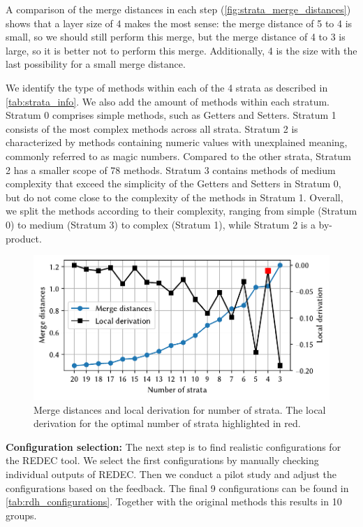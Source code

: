 \documentclass[%
class=scrreprt,
chapterprefix=false,%
open=right,%
twoside=false,%
paper=a4,%
logofile={Logo\_zentral\_farbig\_EN.png},%
thesistype=master,%
UKenglish,%
]{se2thesis}
\theoremstyle{definition}
\newcommand{\rdh}{REDEC\xspace}
\begin{document}
	A comparison of the merge distances in each step (\autoref{fig:strata_merge_distances}) shows that a layer size of 4 makes the most sense: the merge distance of 5 to 4 is small, so we should still perform this merge, but the merge distance of 4 to 3 is large, so it is better not to perform this merge. Additionally, 4 is the size with the last possibility for a small merge distance.
	
	We identify the type of methods within each of the 4 strata as described in \autoref{tab:strata_info}. We also add the amount of methods within each stratum. 
	Stratum 0 comprises simple methods, such as Getters and Setters. Stratum 1 consists of the most complex methods across all strata. 
	Stratum 2 is characterized by methods containing numeric values with unexplained meaning, commonly referred to as magic numbers. Compared to the other strata, Stratum 2 has a smaller scope of 78 methods. 
	Stratum 3 contains methods of medium complexity that exceed the simplicity of the Getters and Setters in Stratum 0, but do not come close to the complexity of the methods in Stratum 1. 
	Overall, we split the methods according to their complexity, ranging from simple (Stratum 0) to medium (Stratum 3) to complex (Stratum 1), while Stratum 2 is a by-product.
	
	\begin{figure}[tb]
		\centering
		\includegraphics[width=\textwidth]{img/strata_merge_distances.pdf}
		\caption{Merge distances and local derivation for number of strata. The local derivation for the optimal number of strata highlighted in red.} 
		\label{fig:strata_merge_distances}
	\end{figure}
	
	\textbf{Configuration selection:} The next step is to find realistic configurations for the \rdh tool. We select the first configurations by manually checking individual outputs of \rdh. Then we conduct a pilot study and adjust the configurations based on the feedback.
	The final 9 configurations can be found in \autoref{tab:rdh_configurations}. Together with the original methods this results in 10 groups.
	
\end{document}
